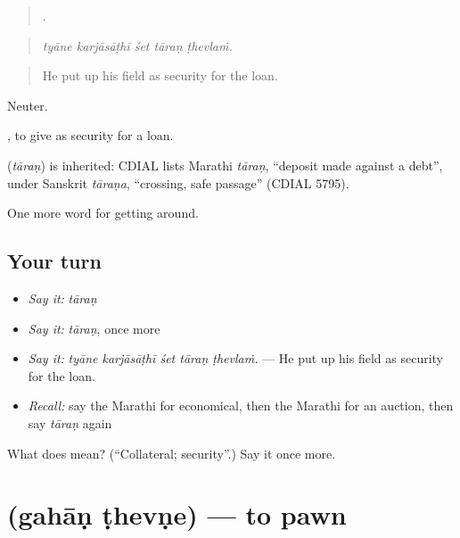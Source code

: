 \begin{quote}
    .
\end{quote}

\begin{quote}
\emph{tyāne karjāsāṭhī śet tāraṇ ṭhevlaṁ.}
\end{quote}

\begin{quote}
He put up his field as security for the loan.
\end{quote}

Neuter.

 , to give as security for a loan.

\begin{cousinweb}
\textbf{} (\emph{tāraṇ}) is inherited: CDIAL lists Marathi \emph{tāraṇ}, \textquotedblleft{}deposit made against a debt\textquotedblright{}, under Sanskrit \emph{tāraṇa}, \textquotedblleft{}crossing, safe passage\textquotedblright{} (CDIAL 5795).
\end{cousinweb}

\begin{grammarlens}[title={What you've built}]
One more word for getting around.
\end{grammarlens}

\subsection*{Your turn}
\begin{itemize}
\raggedright
  \item \emph{Say it:} \emph{tāraṇ}
  \item \emph{Say it:} \emph{tāraṇ}, once more
  \item \emph{Say it:} \emph{tyāne karjāsāṭhī śet tāraṇ ṭhevlaṁ.} — He put up his field as security for the loan.
  \item \emph{Recall:} say the Marathi for economical, then the Marathi for an auction, then say \emph{tāraṇ} again
\end{itemize}

\begin{tcolorbox}[breakable,colback=teal!4,colframe=teal!35!black,title={Before you move on}]
What does  mean? (\textquotedblleft{}Collateral; security\textquotedblright{}.) Say it once more.
\end{tcolorbox}
\section[\texorpdfstring{\mr{गहाण} \mr{ठेवणे} (gahāṇ ṭhevṇe)}{गहाण ठेवणे (gahāṇ ṭhevṇe)}]{  (gahāṇ ṭhevṇe) — to pawn}

